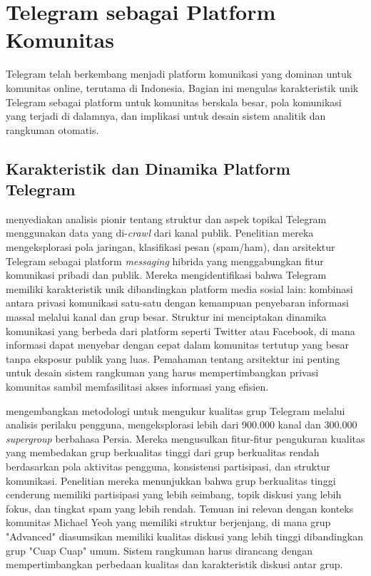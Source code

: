 \section{Telegram sebagai Platform Komunitas}
\label{sec:telegram-platform}

Telegram telah berkembang menjadi platform komunikasi yang dominan untuk komunitas online, terutama di Indonesia. Bagian ini mengulas karakteristik unik Telegram sebagai platform untuk komunitas berskala besar, pola komunikasi yang terjadi di dalamnya, dan implikasi untuk desain sistem analitik dan rangkuman otomatis.

\subsection{Karakteristik dan Dinamika Platform Telegram}

\textcite{nobari2017} menyediakan analisis pionir tentang struktur dan aspek topikal Telegram menggunakan data yang di-\textit{crawl} dari kanal publik. Penelitian mereka mengeksplorasi pola jaringan, klasifikasi pesan (spam/ham), dan arsitektur Telegram sebagai platform \textit{messaging} hibrida yang menggabungkan fitur komunikasi pribadi dan publik. Mereka mengidentifikasi bahwa Telegram memiliki karakteristik unik dibandingkan platform media sosial lain: kombinasi antara privasi komunikasi satu-satu dengan kemampuan penyebaran informasi massal melalui kanal dan grup besar. Struktur ini menciptakan dinamika komunikasi yang berbeda dari platform seperti Twitter atau Facebook, di mana informasi dapat menyebar dengan cepat dalam komunitas tertutup yang besar tanpa eksposur publik yang luas. Pemahaman tentang arsitektur ini penting untuk desain sistem rangkuman yang harus mempertimbangkan privasi komunitas sambil memfasilitasi akses informasi yang efisien.

\textcite{hashemi2019} mengembangkan metodologi untuk mengukur kualitas grup Telegram melalui analisis perilaku pengguna, mengeksplorasi lebih dari 900.000 kanal dan 300.000 \textit{supergroup} berbahasa Persia. Mereka mengusulkan fitur-fitur pengukuran kualitas yang membedakan grup berkualitas tinggi dari grup berkualitas rendah berdasarkan pola aktivitas pengguna, konsistensi partisipasi, dan struktur komunikasi. Penelitian mereka menunjukkan bahwa grup berkualitas tinggi cenderung memiliki partisipasi yang lebih seimbang, topik diskusi yang lebih fokus, dan tingkat spam yang lebih rendah. Temuan ini relevan dengan konteks komunitas Michael Yeoh yang memiliki struktur berjenjang, di mana grup "Advanced" diasumsikan memiliki kualitas diskusi yang lebih tinggi dibandingkan grup "Cuap Cuap" umum. Sistem rangkuman harus dirancang dengan mempertimbangkan perbedaan kualitas dan karakteristik diskusi antar grup.

